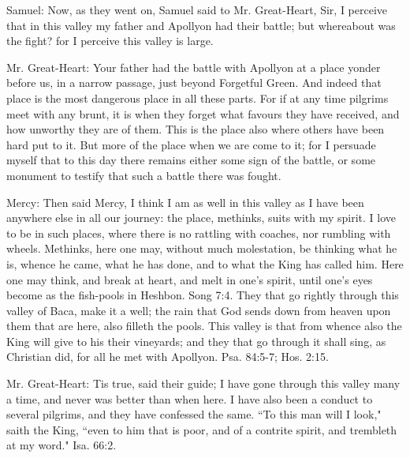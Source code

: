 Samuel: Now, as they went on, Samuel said to Mr. Great-Heart, Sir, I perceive that in this valley my father and Apollyon had their battle; but whereabout was the fight? for I perceive this valley is large.

Mr. Great-Heart: Your father had the battle with Apollyon at a place yonder before us, in a narrow passage, just beyond Forgetful Green. And indeed that place is the most dangerous place in all these parts. For if at any time pilgrims meet with any brunt, it is when they forget what favours they have received, and how unworthy they are of them. This is the place also where others have been hard put to it. But more of the place when we are come to it; for I persuade myself that to this day there remains either some sign of the battle, or some monument to testify that such a battle there was fought.

Mercy: Then said Mercy, I think I am as well in this valley as I have been anywhere else in all our journey: the place, methinks, suits with my spirit. I love to be in such places, where there is no rattling with coaches, nor rumbling with wheels. Methinks, here one may, without much molestation, be thinking what he is, whence he came, what he has done, and to what the King has called him. Here one may think, and break at heart, and melt in one's spirit, until one's eyes become as the fish-pools in Heshbon. Song 7:4. They that go rightly through this valley of Baca, make it a well; the rain that God sends down from heaven upon them that are here, also filleth the pools. This valley is that from whence also the King will give to his their vineyards; and they that go through it shall sing, as Christian did, for all he met with Apollyon. Psa. 84:5-7; Hos. 2:15.

Mr. Great-Heart: Tis true, said their guide; I have gone through this valley many a time, and never was better than when here. I have also been a conduct to several pilgrims, and they have confessed the same. ``To this man will I look," saith the King, ``even to him that is poor, and of a contrite spirit, and trembleth at my word." Isa. 66:2.

